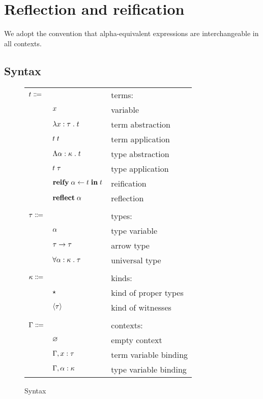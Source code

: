 \section{Reflection and reification}

  We adopt the convention that alpha-equivalent expressions are interchangeable in all contexts.

  \subsection{Syntax}

    \begin{figure}[H]
      \begin{center}
        \begin{tabular}{l l l}
          $t \Coloneqq$ & & terms: \\
          & $x$ & variable \\
          & $\lambda x : \tau \; . \; t$ & term abstraction \\
          & $t \; t$ & term application \\
          & $\Lambda \alpha : \kappa \; . \; t$ & type abstraction \\
          & $t \; \tau$ & type application \\
          & $\textbf{reify} \; \alpha \leftarrow t \; \textbf{in} \; t$ & reification \\
          & $\textbf{reflect} \; \alpha$ & reflection \\
          \\
          $\tau \Coloneqq$ & & types: \\
          & $\alpha$ & type variable \\
          & $\tau \rightarrow \tau$ & arrow type \\
          & $\forall \alpha : \kappa \; . \; \tau$ & universal type \\
          \\
          $\kappa \Coloneqq$ & & kinds: \\
          & $\star$ & kind of proper types \\
          & $\left\langle \tau \right\rangle$ & kind of witnesses \\
          \\
          $\Gamma \Coloneqq$ & & contexts: \\
          & $\varnothing$ & empty context \\
          & $\Gamma, x : \tau$ & term variable binding \\
          & $\Gamma, \alpha : \kappa$ & type variable binding \\
        \end{tabular}
      \end{center}

      \caption{Syntax}
      \label{fig:refl_syntax}
    \end{figure}


